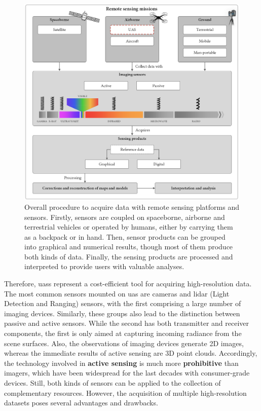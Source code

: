 \begin{figure}[!ht]
	\includegraphics{figs/introduction/introduction_scheme.png}
	\caption{Overall procedure to acquire data with remote sensing platforms and sensors. Firstly, sensors are coupled on spaceborne, airborne and terrestrial vehicles or operated by humans, either by carrying them as a backpack or in hand. Then, sensor products can be grouped into graphical and numerical results, though most of them produce both kinds of data. Finally, the sensing products are processed and interpreted to provide users with valuable analyses. }
    \label{fig:introduction_scheme}
\end{figure}

Therefore, \acrshort{uas}s represent a cost-efficient tool for acquiring high-resolution data. The most common sensors mounted on \acrshort{uas} are cameras and \acrshort{lidar} (Light Detection and Ranging) sensors, with the first comprising a large number of imaging devices. Similarly, these groups also lead to the distinction between passive and active sensors. While the second has both transmitter and receiver components, the first is only aimed at capturing incoming radiance from the scene surfaces. Also, the observations of imaging devices generate 2D images, whereas the immediate results of active sensing are 3D point clouds. Accordingly, the technology involved in \textbf{active sensing} is much more \textbf{prohibitive} than imagers, which have been widespread for the last decades with consumer-grade devices. Still, both kinds of sensors can be applied to the collection of complementary resources. However, the acquisition of multiple high-resolution datasets poses several advantages and drawbacks. 

